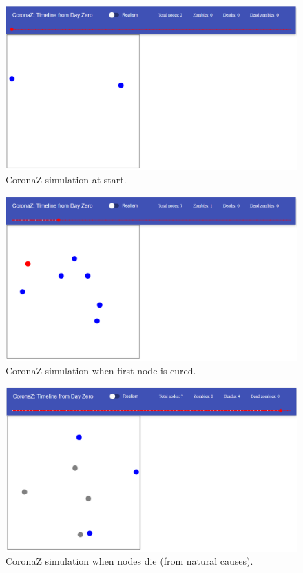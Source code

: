 \documentclass[conference]{IEEEtran}
\begin{document}
	\begin{figure}[htbp]
		\centerline{\includegraphics[width=\linewidth]{img/sim_1.png}}
		\caption{CoronaZ simulation at start.}
		\label{fig:sim_1}
	\end{figure}
	\begin{figure}[htbp]
		\centerline{\includegraphics[width=\linewidth]{img/sim_2.png}}
		\caption{CoronaZ simulation when first node is cured.}
		\label{fig:sim_2}
	\end{figure}
	\begin{figure}[htbp]
		\centerline{\includegraphics[width=\linewidth]{img/sim_3.png}}
		\caption{CoronaZ simulation when nodes die (from natural causes).}
		\label{fig:sim_3}
	\end{figure}
\end{document}
